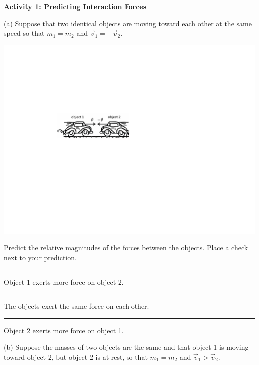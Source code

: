 \textbf{Activity 1: Predicting Interaction Forces} 

(a) Suppose that two identical objects are
moving toward each other at the same speed so that
$m_{1}=m_{2}$ and 
${\vec  v}_1=-{\vec  v}_2$.

{\par\centering \includegraphics{newtons_laws/newtons_laws_fig1_new.pdf} \par}

\pagebreak[2]

\leftskip=1cm

Predict the relative magnitudes of the forces between the objects.
Place a check next to your prediction.

\rule{0.5in}{0.1pt} Object 1 exerts more force on object 2. 

\rule{0.5in}{0.1pt} The objects exert the same force on each other. 

\rule{0.5in}{0.1pt} Object 2 exerts more force on object 1.

\leftskip=0cm

\bigskip

\pagebreak[3]
(b) Suppose the masses of two objects are the same and that object 1 is moving
toward object 2, but object 2 is at rest, so that
$m_{1}=m_{2}$ and
${\vec  v}_1 > {\vec  v}_2$.

